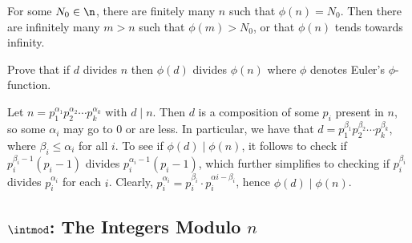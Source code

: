 \begin{problems}
\begin{sol}
        For some $N_0 \in \n$, there are finitely many $n$ such that $\phi(n) = N_0$. Then there are infinitely many $m > n$ such that $\phi(m) > N_0$, or that $\phi(n)$ tends towards infinity.
    \end{sol}
    \item Prove that if $d$ divides $n$ then $\phi(d)$ divides $\phi(n)$ where $\phi$ denotes Euler's $\phi$-function.
    \begin{sol}
        Let $n = p_1^{\alpha_1}p_2^{\alpha_2} \cdots p_k^{\alpha_k}$ with $d \mid n$. Then $d$ is a composition of some $p_i$ present in $n$, so some $\alpha_i$ may go to 0 or are less. In particular, we have that $d = p_1^{\beta_1}p_2^{\beta_2}\cdots p_k^{\beta_k}$, where $\beta_i \leq \alpha_i$ for all $i$. To see if $\phi(d) \mid \phi(n)$, it follows to check if $p_i^{\beta_i - 1}(p_i - 1)$ divides $p_i^{\alpha_i - 1}(p_i - 1)$, which further simplifies to checking if $p_i^{\beta_i}$ divides $p_i^{\alpha_i}$ for each $i$. Clearly, $p_i^{\alpha_i} = p_i^{\beta_i} \cdot p_i^{\alpha i - \beta_i}$, hence $\phi(d) \mid \phi(n)$.
    \end{sol}
\end{problems}

\newpage

\subsection{\texorpdfstring{$\intmod$: The Integers Modulo $n$}{Z/nZ: The Integers Modulo n}}

